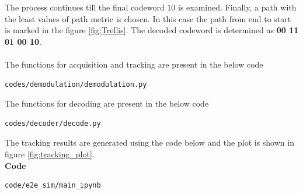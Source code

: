 \noindent The process continues till the final codeword $10$ is examined. Finally, a path with the least values of path metric is chosen. In this case the path from end to start is marked in the figure \ref{fig:Trellis}. The decoded codeword is determined as \textbf{00 11 01 00 10}.
\\
\\
The functions for acquisition and tracking are present in the below code
\begin{lstlisting}
codes/demodulation/demodulation.py
\end{lstlisting}
The functions for decoding are present in the below code
\begin{center}
 \begin{lstlisting}
codes/decoder/decode.py
 \end{lstlisting}
\end{center}
The tracking results are generated using the code below and the plot is shown in figure \ref{fig:tracking_plot}.\\
\textbf{Code}
\begin{lstlisting}
code/e2e_sim/main_ipynb
\end{lstlisting}






